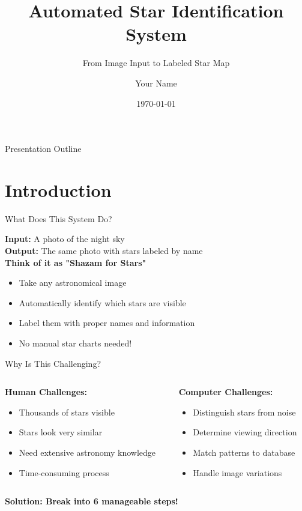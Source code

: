 \documentclass[aspectratio=169]{beamer}
\title{Automated Star Identification System}
\subtitle{From Image Input to Labeled Star Map}
\author{Your Name}
\institute{Your Institution}
\date{\today}
\begin{document}
\frame{\titlepage}

\begin{frame}{Presentation Outline}
\tableofcontents
\end{frame}

\section{Introduction}

\begin{frame}{What Does This System Do?}
\begin{center}
\Large
\textbf{Input:} A photo of the night sky \\[0.5cm]
\textbf{Output:} The same photo with stars labeled by name \\[1cm]

\textcolor{starblue}{\textbf{Think of it as "Shazam for Stars"}}
\end{center}

\begin{itemize}
\item Take any astronomical image
\item Automatically identify which stars are visible
\item Label them with proper names and information
\item No manual star charts needed!
\end{itemize}
\end{frame}

\begin{frame}{Why Is This Challenging?}
\begin{columns}
\begin{column}{0.5\textwidth}
\textbf{Human Challenges:}
\begin{itemize}
\item Thousands of stars visible
\item Stars look very similar
\item Need extensive astronomy knowledge
\item Time-consuming process
\end{itemize}
\end{column}

\begin{column}{0.5\textwidth}
\textbf{Computer Challenges:}
\begin{itemize}
\item Distinguish stars from noise
\item Determine viewing direction
\item Match patterns to database
\item Handle image variations
\end{itemize}
\end{column}
\end{columns}

\vspace{0.5cm}
\begin{center}
\textcolor{starred}{\textbf{Solution: Break into 6 manageable steps!}}
\end{center}
\end{frame}
\end{document}
